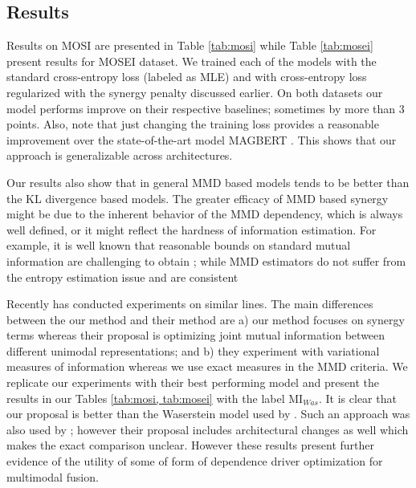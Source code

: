 \documentclass[letterpaper]{article} %
\begin{document}
\subsection{Results}


Results on MOSI are presented in Table \ref{tab:mosi} while Table \ref{tab:mosei} present results for MOSEI dataset.
We trained each of the models with the standard cross-entropy loss (labeled as MLE) and with cross-entropy loss regularized with the synergy penalty discussed earlier. On both datasets our model performs improve on their respective baselines; sometimes by more than 3 points.
Also, note that just changing the training loss provides a reasonable improvement over the state-of-the-art model MAGBERT \citep{rahman2020integrating}. This shows that our approach is generalizable across architectures.

Our results also show that in general MMD based models tends to be better than the KL divergence based models. The greater efficacy of MMD based synergy might be due to the inherent behavior of the MMD dependency, which is always well defined, or it might reflect the hardness of information estimation. For example, it is well known that reasonable bounds on standard mutual information are challenging to obtain \citep{kinney2014equitability}; while MMD estimators do not suffer from the entropy estimation issue and are consistent \citep{gretton2012mmd}

Recently \citet{colombo2021improving} has conducted experiments on similar lines. The main differences between the our method and their method are a) our method focuses on synergy terms whereas their proposal is optimizing joint mutual information between different unimodal representations; and b) they experiment with variational measures of information whereas we use exact measures in the MMD criteria. We replicate our experiments with their best performing model and present the results in our Tables \ref{tab:mosi, tab:mosei} with the label $\text{MI}_{Was}$. It is clear that our proposal is better than the Waserstein model used by \citet{colombo2021improving}. Such an approach was also used by \citet{han2021improving}; however their proposal includes architectural changes as well which makes the exact comparison unclear. However these results present further evidence of the utility of some of form of dependence driver optimization for multimodal fusion.
\end{document}
